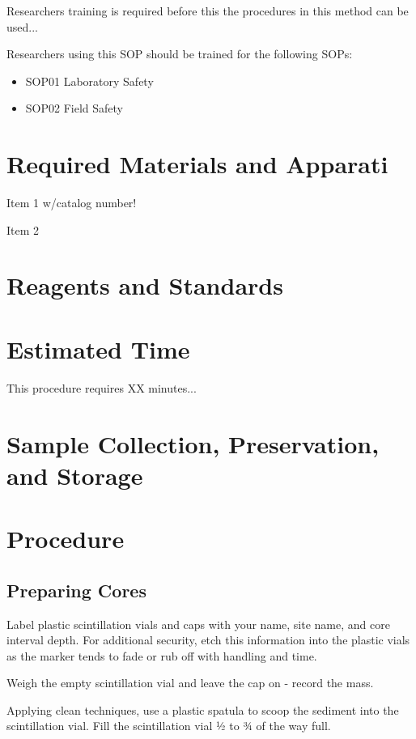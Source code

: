 \documentclass[12pt]{../SOP3}\usepackage[]{graphicx}\usepackage[]{color}
\begin{document}
\NP Researchers training is required before this the procedures in this method can be used... 

\NP Researchers using this SOP should be trained for the following SOPs:

\begin{itemize}
  \item SOP01 Laboratory Safety
  \item SOP02 Field Safety
\end{itemize}

\section{Required Materials and Apparati}

\NP Item 1 w/catalog number!

\NP Item 2

\section{Reagents and Standards}

\section{Estimated Time}

\NP This procedure requires XX minutes...

\section{Sample Collection, Preservation, and Storage}

\section{Procedure}

\subsection{Preparing Cores}

\NP Label plastic scintillation vials and caps with your name, site name, and core interval depth. For additional security, etch this information into the plastic vials as the marker tends to fade or rub off with handling and time. 

\NP Weigh the empty scintillation vial and leave the cap on - record the mass. 

\NP Applying clean techniques, use a plastic spatula to scoop the sediment into the scintillation vial. Fill the scintillation vial 1⁄2 to 3⁄4 of the way full. 
\end{document}
